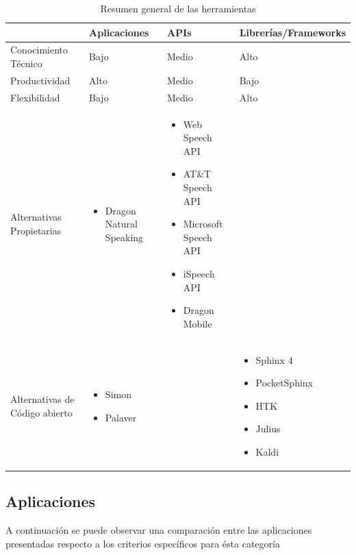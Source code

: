 \begin{table}[H]
\centering
\footnotesize
\begin{tabular}{|p{3.5cm}|>{\centering}p{3.5cm}|>{\centering}p{3.5cm}|>{\centering}p{3.5cm}|}
\hline
                               & Aplicaciones             &  APIs                            & Librer\'ias/Frameworks \tabularnewline
\hline
Conocimiento T\'ecnico         &     Bajo                    & Medio                            & Alto    \tabularnewline
Productividad                  &     Alto                    & Medio                            & Bajo    \tabularnewline
Flexibilidad                   &     Bajo                    & Medio                            & Alto    \tabularnewline
Alternativas Propietarias      & \begin{itemize} \item Dragon Natural Speaking \end{itemize}  & \begin{itemize} \item Web Speech API \item AT\&T Speech API \item Microsoft Speech API \item iSpeech API \item Dragon Mobile \end{itemize}  &  \tabularnewline
Alternativas de Código abierto & \begin{itemize} \item Simon \item Palaver \end{itemize}          &                                  & \begin{itemize} \item Sphinx 4 \item PocketSphinx \item HTK \item Julius \item Kaldi \end{itemize} \tabularnewline
\hline
\end{tabular}
\caption{Resumen general de las herramientas}
\label{sec:resumen-herramientas}
\end{table}

\subsection{Aplicaciones}

A continuaci\'on se puede observar una comparaci\'on entre las aplicaciones presentadas respecto a los criterios espec\'ificos
para \'esta categor\'ia


